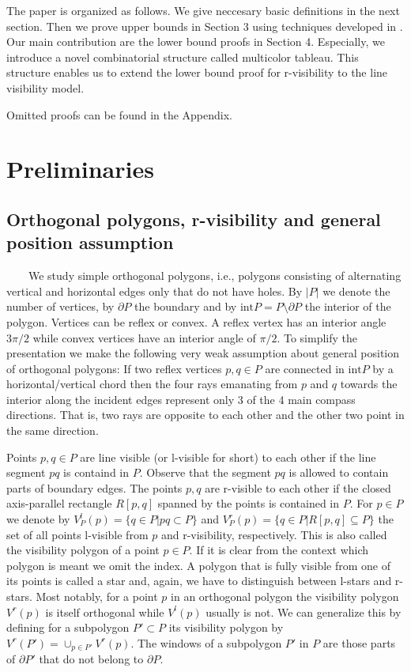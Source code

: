 \documentclass[a4paper,USenglish,numberwithinsect]{lipics}
\theoremstyle{plain}
\begin{document}
The paper is organized as follows. We give neccesary basic definitions in the next section. Then we prove upper bounds in Section 3 using techniques developed 
in \cite{BS, B_etal}. Our main contribution are the lower bound proofs in Section 4. Especially, we introduce a novel combinatorial structure called multicolor tableau.
 This structure enables us to extend the lower bound proof for r-visibility
to the line visibility model.

Omitted proofs can be found in the Appendix.

\section{Preliminaries}
\subsection{Orthogonal polygons, r-visibility and general position assumption}
\ \ \ \ We study simple orthogonal polygons, i.e., polygons   consisting of
alternating  vertical and horizontal edges only that do not have holes.
By $|P|$ we denote the number of vertices, by  $\partial P$ the boundary
and by $\mbox{int}P= P\setminus \partial P$ the interior of the polygon.
Vertices can be reflex or convex. A reflex vertex has an interior angle 
$3\pi/2$ while convex vertices have an interior angle of $\pi/2$. To
simplify the presentation we make the following very weak assumption
about general position of orthogonal polygons: If two reflex vertices
$p,q\in P$ are connected in $\mbox{int}P$ by a horizontal/vertical chord
then the four rays emanating from $p$ and $q$ towards the interior along
the incident edges represent only 3 of the 4 main compass directions.
That is, two rays are opposite to each other and the other two point in
the same direction. 

Points $p,q\in P$ are line visible (or l-visible for short) to each
other if the line segment $pq$ is containd in $P$. Observe that the
segment $pq$ is allowed
to contain parts of boundary edges. The points $p,q$ are r-visible to
each other if the closed axis-parallel rectangle $R[p,q]$ spanned by the points is contained
in $P$. 
For $p\in P$ we denote by $V^l_P(p)=\{q\in P| pq\subset P\}$ and
$V^r_P(p)=\{q\in P| R[p,q]\subseteq P\}$ the set of all points l-visible
from $p$  and r-visibility, respectively. This is also called the
visibility polygon of a point $p\in P$. If it is clear from the context
which polygon is meant we omit the index.  A polygon that is fully
visible from one of its points is called a star and, again, we have to
distinguish between l-stars and r-stars. Most notably, for a point $p$
in an orthogonal polygon the visibility polygon $V^r(p)$
is itself orthogonal while $V^l(p)$ usually is not. We can generalize
this by defining
for a subpolygon $P'\subset P$ its visibility polygon by
$V^r(P')=\cup_{p\in P'}V^r(p)$. The windows of a subpolygon $P'$ in $P$
are those parts of  $\partial P'$
 that do not belong to $\partial P$.
\end{document}
